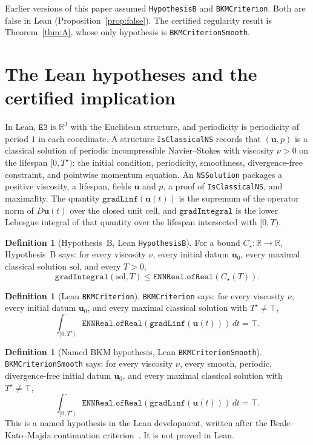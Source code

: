 \documentclass[11pt,reqno]{amsart}
\theoremstyle{definition}
\newtheorem{definition}[theorem]{Definition}
\newcommand{\R}{\mathbb{R}}
\newcommand{\uvec}{\mathbf{u}}
\numberwithin{equation}{section}
\begin{document}
Earlier versions of this paper assumed \texttt{HypothesisB} and \texttt{BKMCriterion}. Both are false in Lean (Proposition~\ref{prop:false}). The certified regularity result is Theorem~\ref{thm:A}, whose only hypothesis is \texttt{BKMCriterionSmooth}.

\section{The Lean hypotheses and the certified implication}

In Lean, \(\texttt{E3}\) is \(\R^3\) with the Euclidean structure, and periodicity is periodicity of period \(1\) in each coordinate. A structure \texttt{IsClassicalNS} records that \((\uvec,p)\) is a classical solution of periodic incompressible Navier--Stokes with viscosity \(\nu>0\) on the lifespan \([0,T^\star)\): the initial condition, periodicity, smoothness, divergence-free constraint, and pointwise momentum equation. An \texttt{NSSolution} packages a positive viscosity, a lifespan, fields \(\uvec\) and \(p\), a proof of \texttt{IsClassicalNS}, and maximality. The quantity \(\texttt{gradLinf}(\uvec(t))\) is the supremum of the operator norm of \(D\uvec(t)\) over the closed unit cell, and \(\texttt{gradIntegral}\) is the lower Lebesgue integral of that quantity over the lifespan intersected with \([0,T)\).

\begin{definition}[Hypothesis~B, Lean \texttt{HypothesisB}]\label{def:hypB}
For a bound \(C_\star:\R\to\R\), Hypothesis~B says: for every viscosity \(\nu\), every initial datum \(\uvec_0\), every maximal classical solution \(\mathrm{sol}\), and every \(T>0\),
\[
\texttt{gradIntegral}(\mathrm{sol},T)\le \texttt{ENNReal.ofReal}(C_\star(T)).
\]
\end{definition}

\begin{definition}[Lean \texttt{BKMCriterion}]\label{def:bkmAll}
\texttt{BKMCriterion} says: for every viscosity \(\nu\), every initial datum \(\uvec_0\), and every maximal classical solution with \(T^\star\neq\top\),
\[
\int_{[0,T^\star)}^\texttt{-}\texttt{ENNReal.ofReal}(\texttt{gradLinf}(\uvec(t)))\,dt=\top.
\]
\end{definition}

\begin{definition}[Named BKM hypothesis, Lean \texttt{BKMCriterionSmooth}]\label{def:bkm}
\texttt{BKMCriterionSmooth} says: for every viscosity \(\nu\), every smooth, periodic, divergence-free initial datum \(\uvec_0\), and every maximal classical solution with \(T^\star\neq\top\),
\[
\int_{[0,T^\star)}^\texttt{-}\texttt{ENNReal.ofReal}(\texttt{gradLinf}(\uvec(t)))\,dt=\top.
\]
This is a named hypothesis in the Lean development, written after the Beale--Kato--Majda continuation criterion~\cite{BKM1984}. It is not proved in Lean.
\end{definition}
\end{document}
